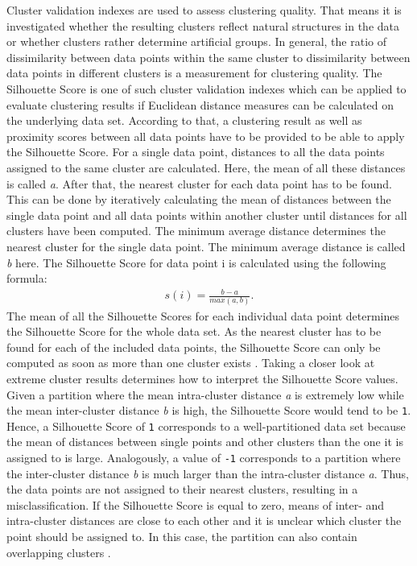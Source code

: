 Cluster validation indexes are used to assess clustering quality. That means it is investigated whether the resulting clusters reflect natural structures in the data or whether clusters rather determine artificial groups. In general, the ratio of dissimilarity between data points within the same cluster to dissimilarity between data points in different clusters is a measurement for clustering quality. 
The Silhouette Score is one of such cluster validation indexes which can be applied to evaluate clustering results if Euclidean distance measures can be calculated on the underlying data set. According to that, a clustering result as well as proximity scores between all data points have to be provided to be able to apply the Silhouette Score. 
For a single data point, distances to all the data points assigned to the same cluster are calculated. Here, the mean of all these distances is called \textit{a}. After that, the nearest cluster for each data point has to be found. This can be done by iteratively calculating the mean of distances between the single data point and all data points within another cluster until distances for all clusters have been computed. The minimum average distance determines the nearest cluster for the single data point. 
The minimum average distance is called \textit{b} here. The Silhouette Score for data point i is calculated using the following formula:
\begin{align*}
	s(i)=\frac{b - a}{max(a, b)}.
\end{align*}
The mean of all the Silhouette Scores for each individual data point determines the Silhouette Score for the whole data set. As the nearest cluster has to be found for each of the included data points, the Silhouette Score can only be computed as soon as more than one cluster exists \cite{rousseeuw1987silhouettes}.
Taking a closer look at extreme cluster results determines how to interpret the Silhouette Score values. Given a partition where the mean intra-cluster distance \textit{a} is extremely low while the mean inter-cluster distance \textit{b} is high, the Silhouette Score would tend to be \texttt{1}. Hence, a Silhouette Score of \texttt{1} corresponds to a well-partitioned data set because the mean of distances between single points and other clusters than the one it is assigned to is large. Analogously, a value of \texttt{-1} corresponds to a partition where the inter-cluster distance \textit{b} is much larger than the intra-cluster distance \textit{a}. Thus, the data points are not assigned to their nearest clusters, resulting in a misclassification. If the Silhouette Score is equal to zero, means of inter- and intra-cluster distances are close to each other and it is unclear which cluster the point should be assigned to. In this case, the partition can also contain overlapping clusters \cite{rousseeuw1987silhouettes}.
